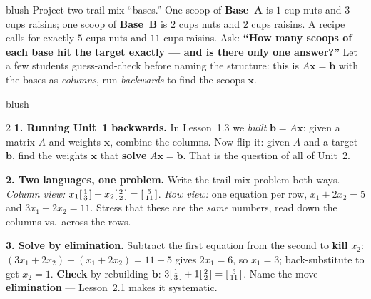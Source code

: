 \documentclass[10pt]{article}
\newcommand{\xx}{\mathbf{x}}
\newcommand{\bb}{\mathbf{b}}
\begin{document}
\begin{skillbox}[Hook]{blush}
    Project two trail-mix ``bases.'' One scoop of \textbf{Base~A} is $1$ cup nuts and $3$ cups
    raisins; one scoop of \textbf{Base~B} is $2$ cups nuts and $2$ cups raisins. A recipe calls
    for exactly $5$ cups nuts and $11$ cups raisins. Ask: \textbf{``How many scoops of each base
    hit the target exactly --- and is there only one answer?''} Let a few students guess-and-check
    before naming the structure: this is $A\xx=\bb$ with the bases as \emph{columns}, run
    \emph{backwards} to find the scoops $\xx$.
\end{skillbox}

\begin{skillbox}[Lesson]{blush}
\begin{multicols}{2}
\textbf{1. Running Unit~1 backwards.} In Lesson~1.3 we \emph{built} $\bb=A\xx$: given a matrix
$A$ and weights $\xx$, combine the columns. Now flip it: given $A$ and a target $\bb$, find the
weights $\xx$ that \textbf{solve} $A\xx=\bb$. That is the question of all of Unit~2.

\textbf{2. Two languages, one problem.} Write the trail-mix problem both ways. \emph{Column
view:} $x_1\begin{bsmallmatrix} 1\\3 \end{bsmallmatrix}+x_2\begin{bsmallmatrix} 2\\2 \end{bsmallmatrix}=\begin{bsmallmatrix} 5\\11 \end{bsmallmatrix}$. \emph{Row view:} one equation per
row, $x_1+2x_2=5$ and $3x_1+2x_2=11$. Stress that these are the \emph{same} numbers, read
down the columns vs.\ across the rows.

\columnbreak

\textbf{3. Solve by elimination.} Subtract the first equation from the second to \textbf{kill}
$x_2$: $(3x_1+2x_2)-(x_1+2x_2)=11-5$ gives $2x_1=6$, so $x_1=3$; back-substitute to get $x_2=1$.
\textbf{Check} by rebuilding $\bb$: $3\begin{bsmallmatrix} 1\\3 \end{bsmallmatrix}+1\begin{bsmallmatrix} 2\\2 \end{bsmallmatrix}=\begin{bsmallmatrix} 5\\11 \end{bsmallmatrix}$. Name the move
\textbf{elimination} --- Lesson~2.1 makes it systematic.


\end{multicols}
\end{skillbox}
\end{document}
